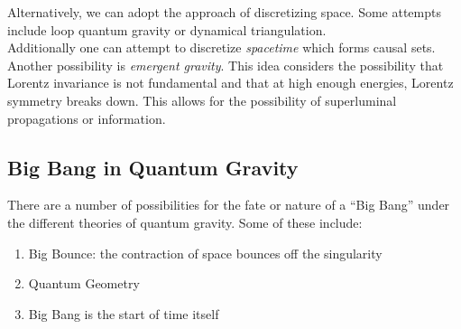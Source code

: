 \documentclass{article}
\begin{document}
Alternatively, we can adopt the approach of discretizing space. Some attempts include loop quantum gravity or dynamical triangulation. \\

Additionally one can attempt to discretize \textit{spacetime} which forms causal sets. \\

Another possibility is \textit{emergent gravity}. This idea considers the possibility that Lorentz invariance is not fundamental and that at high enough energies, Lorentz symmetry breaks down. This allows for the possibility of superluminal propagations or information.

\subsection{Big Bang in Quantum Gravity}

There are a number of possibilities for the fate or nature of a ``Big Bang'' under the different theories of quantum gravity. Some of these include:
\begin{enumerate}
    \item Big Bounce: the contraction of space bounces off the singularity
    \item Quantum Geometry
    \item Big Bang is the start of time itself
\end{enumerate}
\end{document}
